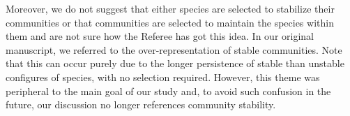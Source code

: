 \documentclass[12pt]{letter}
\begin{document}
      Moreover, we do not suggest that either species are selected to stabilize their communities or that communities are selected to maintain the species within them and are not sure how the Referee has got this idea. In our original manuscript, we referred to the over-representation of stable communities. Note that this can occur purely due to the longer persistence of stable than unstable configures of species, with no selection required. However, this theme was peripheral to the main goal of our study and, 
      to avoid such confusion in the future, our discussion no longer references community stability.
\end{document}
